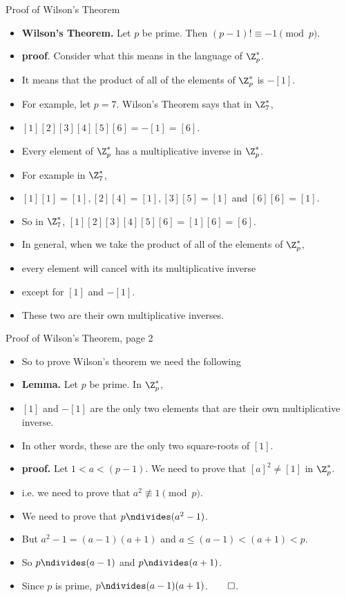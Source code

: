 \documentclass{beamer}
\begin{document}
\begin{frame}{Proof of Wilson's Theorem}

\begin{itemize}
  \item \textbf{Wilson's Theorem.} Let $p$ be prime. Then $(p-1)! \equiv -1 \pmod p$.
  \item \textbf{proof}. Consider what this means in the language of $\Z_p^*$.
  \item It means that the product of all of the elements of $\Z_p^*$ is $-[1]$.
  \item For example, let $p=7$. Wilson's Theorem says that in $\Z_7^*$,
  \item $[1][2][3][4][5][6] = -[1] = [6]$.
  \item Every element of $\Z_p^*$ has a multiplicative inverse in $\Z_p^*$.
  \item For example in $\Z_7^*$,
  \item $[1][1]=[1], [2][4]=[1],[3][5]=[1]$ and $[6][6] = [1]$.
  \item So in $\Z_7^*$, $[1][2][3][4][5][6] = [1][6] = [6]$.
  \item In general, when we take the product of all of the elements of $\Z_p^*$,
  \item every element will cancel with its multiplicative inverse
  \item except for $[1]$ and $-[1]$.
  \item These two are their own multiplicative inverses.
\end{itemize}

\end{frame}

\begin{frame}{Proof of Wilson's Theorem, page 2}
\begin{itemize}
  \item So to prove Wilson's theorem we need the following
  \item \textbf{Lemma.} Let $p$ be prime. In $\Z_p^*$,
  \item $[1]$ and $-[1]$ are the only two elements that are their own multiplicative inverse.
  \item In other words, these are the only two square-roots of $[1]$.
  \item \textbf{proof.} Let $1<a<(p-1)$. We need to prove that $[a]^2 \neq [1]$ in $\Z_p^*$.
  \item i.e. we need to prove that $a^2 \not\equiv 1 \pmod p$.
  \item We need to prove that $p\ndivides (a^2 - 1)$.
  \item But $a^2 - 1 = (a-1)(a+1)$ and $a\leq(a-1)<(a+1)<p$.
  \item So $p\ndivides (a-1)$ and $p\ndivides (a+1)$.
  \item Since $p$ is prime, $p\ndivides (a-1)(a+1)$.$\qed$.
\end{itemize}

\end{frame}
\end{document}

